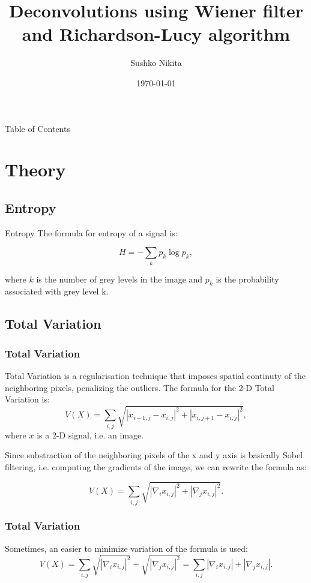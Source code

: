 \documentclass[aspectratio=1610]{beamer}
\title{Deconvolutions using Wiener filter and Richardson-Lucy algorithm}
\author{Sushko Nikita}
\date\today
\begin{document}
\begin{frame}[plain]
  \titlepage
\end{frame}


\begin{frame}{Table of Contents}
  \tableofcontents
\end{frame}

\section{Theory}

\begin{frame}
  \tableofcontents[currentsection, subsectionstyle=show/show/hide]
\end{frame}

\subsection {Entropy}
\begin{frame}{Entropy}
  The formula for entropy of a signal is:
  
  $$
  H = - \sum\limits_{k}{p_k \log{p_k}},
  $$
  
  where $k$ is the number of grey levels in the image and 
  $p_k$ is the probability associated with grey level k.
\end{frame}

\subsection {Total Variation}
\begin{frame}
  \frametitle{Total Variation}
  Total Variation is a regularisation technique 
  that imposes spatial continuty of the 
  neighboring pixels, penalizing the outliers.
  The formula for the 2-D Total Variation is:
  $$
  V(X) = \sum\limits_{i, j}{\sqrt{|x_{i+1, j} - x_{i, j}|^2 + |x_{i, j+1} - x_{i, j}|^2}},
  $$
  where $x$ is a 2-D signal, i.e. an image.
  
  Since substraction of the neighboring pixels of the x and y axis is 
  basically Sobel filtering, i.e. computing the gradients of the image,
  we can rewrite the formula as:
  
  $$
  V(X) = \sum\limits_{i, j}{\sqrt{|\nabla_{i}x_{i, j}|^2 + |\nabla_{j}x_{i, j}|^2}}.
  $$
\end{frame}

\begin{frame}
  \frametitle{Total Variation}
  Sometimes, an easier to minimize variation of the formula is used:
  $$
  V(X) = \sum\limits_{i, j}{\sqrt{|\nabla_{i}x_{i, j}|^2} + \sqrt{|\nabla_{j}x_{i, j}|^2}} = 
  \sum\limits_{i, j}{|\nabla_{i}x_{i, j}| + |\nabla_{j}x_{i, j}|}.
  $$
\end{frame}
\end{document}
